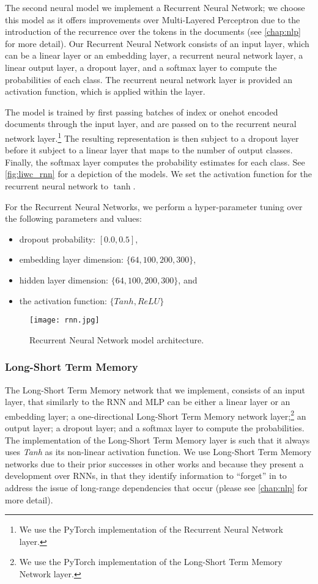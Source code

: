 The second neural model we implement a Recurrent Neural Network; we choose this model as it offers improvements over Multi-Layered Perceptron due to the introduction of the recurrence over the tokens in the documents (see \autoref{chap:nlp} for more detail). Our Recurrent Neural Network consists of an input layer, which can be a linear layer or an embedding layer, a recurrent neural network layer, a linear output layer, a dropout layer, and a softmax layer to compute the probabilities of each class. The recurrent neural network layer is provided an activation function, which is applied within the layer. 

The model is trained by first passing batches of index or onehot encoded documents through the input layer, and are passed on to the recurrent neural network layer.\footnote{We use the PyTorch implementation of the Recurrent Neural Network layer.} The resulting representation is then subject to a dropout layer before it subject to a linear layer that maps to the number of output classes. Finally, the softmax layer computes the probability estimates for each class. See \autoref{fig:liwc_rnn} for a depiction of the models. We set the activation function for the recurrent neural network to $\tanh$.

For the Recurrent Neural Networks, we perform a hyper-parameter tuning over the following parameters and values:

\begin{itemize}
  \item dropout probability: $[0.0, 0.5]$,
  \item embedding layer dimension: $\{64, 100, 200, 300\}$,
  \item hidden layer dimension: $\{64, 100, 200, 300\}$, and
   \item the activation function: $\{Tanh, ReLU\}$
\end{itemize}

\begin{figure}
  \centering
  \texttt{[image: rnn.jpg]}
  \caption{Recurrent Neural Network model architecture.}
  \label{fig:liwc_rnn}
\end{figure}

\subsubsection{Long-Short Term Memory}

The Long-Short Term Memory network that we implement, consists of an input layer, that similarly to the RNN and MLP can be either a linear layer or an embedding layer; a one-directional Long-Short Term Memory network layer;\footnote{We use the PyTorch implementation of the Long-Short Term Memory Network layer.} an output layer; a dropout layer; and a softmax layer to compute the probabilities. The implementation of the Long-Short Term Memory layer is such that it always uses \textit{Tanh} as its non-linear activation function. We use Long-Short Term Memory networks due to their prior successes in other works \cite{CITE: LSTM papers} and because they present a development over RNNs, in that they identify information to ``forget'' in to address the issue of long-range dependencies that occur (please see \autoref{chap:nlp} for more detail).

